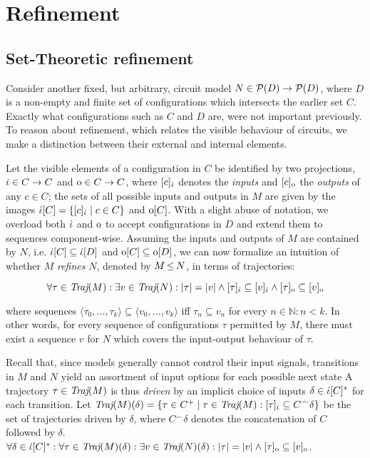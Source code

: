 \section{Refinement}

\subsection{Set-Theoretic refinement}

Consider another fixed, but arbitrary, circuit model $N \in \mathcal{P}(D) \rightarrow \mathcal{P}(D)$, where $D$ is a non-empty and finite set of configurations which intersects the earlier set $C$. Exactly what configurations such as $C$ and $D$ are, were not important previously. To reason about refinement, which relates the visible behaviour of circuits, we make a distinction between their external and internal elements.


Let the visible elements of a configuration in $C$ be identified by two projections, $\dot{\iota} \in C \rightarrow C$ and $\mathrm{o} \in C \rightarrow C$, where $[c]_{\dot{\iota}}$ denotes the \textit{inputs} and $[c]_{\mathrm{o}}$ the \textit{outputs} of any $c \in C$; the sets of all possible inputs and outputs in $M$ are given by the images $\dot{\iota}[C] = \{ [c]_{\dot{\iota}} \mid c \in C \}$ and $\mathrm{o}[C]$. With a slight abuse of notation, we overload both $\dot{\iota}$ and $\mathrm{o}$ to accept configurations in $D$ and extend them to sequences component-wise. Assuming the inputs and outputs of $M$ are contained by $N$, i.e. $\dot{\iota}[C] \subseteq \dot{\iota}[D]$ and $\mathrm{o}[C] \subseteq \mathrm{o}[D]$, we can now formalize an intuition of whether $M$ \textit{refines} $N$, denoted by $M \operatorname{\leq} N$, in terms of trajectories:

\begin{equation*}
\forall \tau \in \operatorname{\textit{Traj}}(M) : \exists v \in \operatorname{\textit{Traj}}(N) : | \tau | = | v | \wedge [\tau]_{\dot{\iota}} \subseteq [v]_{\dot{\iota}} \wedge [\tau]_{\mathrm{o}} \subseteq [v]_{\mathrm{o}}
\end{equation*}

\noindent where sequences $\langle \tau_{0}, \ldots, \tau_{k} \rangle \subseteq \langle v_{0}, \ldots, v_{k} \rangle$ iff $\tau_{n} \subseteq v_{n}$ for every $n \in \mathbb{N} : n < k$. In other words, for every sequence of configurations $\tau$ permitted by $M$, there must exist a sequence $v$ for $N$ which covers the input-output behaviour of $\tau$.

Recall that, since models generally cannot control their input signals, transitions in $M$ and $N$ yield an assortment of input options for each possible next state A trajectory $\tau \in \operatorname{\textit{Traj}}(M)$ is thus \textit{driven} by an implicit choice of inputs $\delta \in \dot{\iota}[C]^{*}$ for each transition. Let $\operatorname{\textit{Traj}}(M)(\delta) = \{ \tau \in C^{+} \mid \tau \in \operatorname{\textit{Traj}}(M) : [\tau]_{\dot{\iota}} \subseteq C^{\frown}\delta \}$ be the set of trajectories driven by $\delta$, where $C^{\frown}\delta$ denotes the concatenation of $C$ followed by $\delta$.  $\forall \delta \in \dot{\iota}[C]^{*} : \forall \tau \in \operatorname{\textit{Traj}}(M)(\delta) : \exists v \in \operatorname{\textit{Traj}}(N)(\delta) : | \tau | = | v | \wedge [\tau]_{\mathrm{o}} \subseteq [v]_{\mathrm{o}}$.

